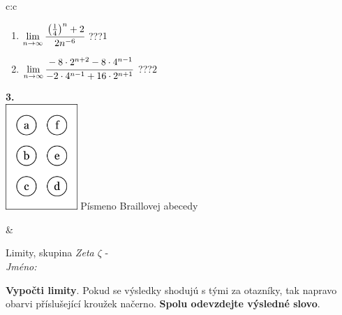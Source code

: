 \documentclass[10pt]{report}
\begin{document}
\begin{tabular}{c:c}
\begin{minipage}[c][104.5mm][t]{0.5\linewidth}
\begin{center}
\begin{minipage}{0.79\linewidth}
\begin{center}
\begin{varwidth}{\linewidth}
\begin{enumerate}
\item $\lim\limits_{n\to\infty}\cfrac{\left(\frac{1}{4}\right)^n +2}{2n^{-6}}$\quad \dotfill\; ???\;\dotfill \quad $1$
\item $\lim\limits_{n\to\infty}\cfrac{-8\cdot 2^{n+2}-8\cdot 4^{n-1}}{-2\cdot 4^{n-1}+16\cdot 2^{n+1}}$\quad \dotfill\; ???\;\dotfill \quad $2$
\end{enumerate}
\end{varwidth}
\end{center}
\end{minipage}
\begin{minipage}{0.20\linewidth}
\begin{center}
{\Huge\bfseries 3.} \\[2mm]
\includegraphics[height=40mm]{../images/braille.png}
{\small Písmeno Braillovej abecedy}
\end{center}
\end{minipage}
\end{center}
\end{minipage}
&
\begin{minipage}[c][104.5mm][t]{0.5\linewidth}
\begin{center}
\vspace{7mm}
{\huge Limity, skupina \textit{Zeta $\zeta$} -}\\[5mm]
\textit{Jméno:}\phantom{xxxxxxxxxxxxxxxxxxxxxxxxxxxxxxxxxxxxxxxxxxxxxxxxxxxxxxxxxxxxxxxxx}\\[5mm]
\begin{minipage}{0.95\linewidth}
\begin{center}
\textbf{Vypočti limity}. Pokud se výsledky shodujú s tými za otazníky, tak napravo\\obarvi příslušející kroužek načerno. \textbf{Spolu odevzdejte výsledné slovo}.
\end{center}
\end{minipage}
\\[1mm]
\begin{minipage}{0.79\linewidth}
\begin{center}
\begin{varwidth}{\linewidth}

\end{varwidth}
\end{center}
\end{minipage}
\end{center}
\end{minipage}
\end{tabular}
\end{document}
